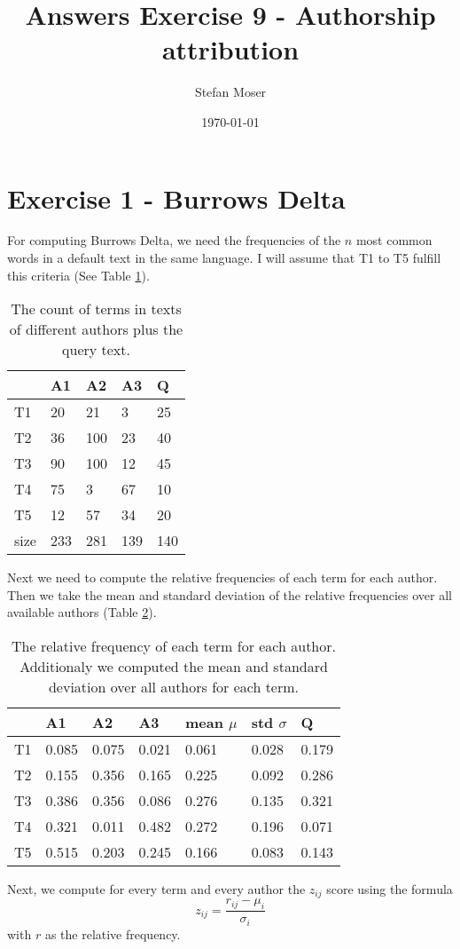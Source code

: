 \documentclass[11pt]{article}
\title{\textbf{Answers Exercise 9 - Authorship attribution}}
\author{Stefan Moser}
\date{\today}
\begin{document}
\maketitle

\section*{Exercise 1 - Burrows Delta}
For computing Burrows Delta, we need the 
frequencies of the $n$ most common words in a default text in the same language. I will
assume that T1 to T5 fulfill this criteria (See Table \ref{table:count}). 
\begin{table}[h]
\center
\begin{tabular}{|l|l|l|l|l|}
\hline
	 & A1 & A2 & A3 & Q\\
\hline
	T1 & 20 & 21 & 3 & 25\\
\hline
	T2 & 36 & 100 & 23 & 40\\
\hline
	T3 & 90 & 100 & 12 & 45\\
\hline
	T4 & 75 & 3 & 67 & 10\\
\hline
	T5 & 12 & 57 & 34 & 20\\
\hline
	size & 233 & 281 & 139 & 140\\
\hline
\end{tabular}
\caption{The count of terms in texts of different authors plus the query text.}
\label{table:count}
\end{table}
Next we need to compute the relative frequencies of each term for each author. Then we take the mean and standard deviation of the relative frequencies over
all available authors (Table \ref{table:rel_freq}).
\begin{table}[h]
\center
\begin{tabular}{|l|l|l|l|l|l||l|}
\hline
	 & A1 & A2 & A3 & mean $\mu$ & std $\sigma$ & Q\\
\hline
	T1 & 0.085 & 0.075 & 0.021 & 0.061 & 0.028 & 0.179\\
\hline
	T2 & 0.155 & 0.356 & 0.165 & 0.225 & 0.092 & 0.286 \\
\hline
	T3 & 0.386 & 0.356 & 0.086 & 0.276 & 0.135 & 0.321 \\
\hline
	T4 & 0.321 & 0.011 & 0.482 & 0.272 & 0.196 & 0.071 \\
\hline
	T5 & 0.515 & 0.203 & 0.245 & 0.166 & 0.083 & 0.143 \\
\hline
\end{tabular}
\caption{The relative frequency of each term
for each author. Additionaly we computed
the mean and standard deviation over all
authors for each term.}
\label{table:rel_freq}
\end{table}
Next, we compute for every term and every author the $z_{ij}$ score using the formula
\begin{equation}
	z_{ij} = \frac{r_{ij} - \mu_i}{\sigma_i}
\end{equation}
with $r$ as the relative frequency. 
\end{document}
